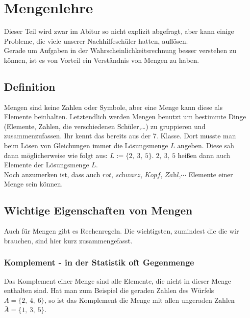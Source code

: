 \section{Mengenlehre}
	Dieser Teil wird zwar im Abitur so nicht explizit abgefragt, aber kann einige
	Probleme, die viele unserer Nachhilfeschüler hatten, auflösen.\\
	Gerade um Aufgaben in der Wahrscheinlichkeitsrechnung besser verstehen zu
	können, ist es von Vorteil ein Verständnis von Mengen zu haben.

	\subsection{Definition}
		Mengen sind keine Zahlen oder Symbole, aber eine Menge kann diese als Elemente
		beinhalten. Letztendlich werden Mengen benutzt um bestimmte Dinge
		(Elemente, Zahlen, die verschiedenen Schüler,\ldots) zu gruppieren und
		zusammenzufassen. Ihr kennt das bereits aus der 7. Klasse. Dort musste man
		beim Lösen von Gleichungen immer die Lösungsmenge \(L\) angeben. Diese sah
		dann möglicherweise wie folgt aus: \(L:=\{2,\ 3,\ 5\}\). \(2,\ 3,\ 5\) heißen
		dann auch Elemente der Lösungsmenge \(L\).\\
		Noch anzumerken ist, dass auch \(\textit{rot}\), \(\textit{schwarz}\),
		\(\textit{Kopf}\), \(\textit{Zahl}\),\(\cdots\) Elemente einer Menge sein
		können.\\

	\subsection{Wichtige Eigenschaften von Mengen}
			Auch für Mengen gibt es Rechenregeln. Die wichtigsten, zumindest die die wir
			brauchen, sind hier kurz zusammengefasst.
			\subsubsection{Komplement - in der Statistik oft Gegenmenge}
				Das Komplement einer Menge sind alle Elemente, die nicht in dieser Menge
				enthalten sind. Hat man zum Beispiel die geraden Zahlen des Würfels
				\(A=\{2,\ 4,\ 6\}\), so ist das Komplement die Menge mit allen ungeraden
				Zahlen \(\bar{A}=\{1,\ 3,\ 5\}\).
